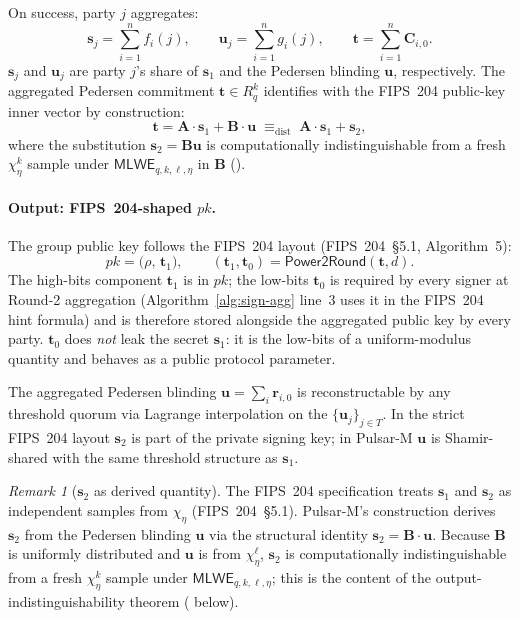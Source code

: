 \documentclass[11pt,a4paper]{article}
\theoremstyle{definition}
\theoremstyle{remark}
\newtheorem{remark}{Remark}
\newcommand{\Rq}{R_q}
\newcommand{\MLWE}{\mathsf{MLWE}}
\newcommand{\Power}{\mathsf{Power2Round}}
\begin{document}
On success, party $j$ aggregates:
\[
\mathbf{s}_j = \sum_{i=1}^n f_i(j), \qquad
\mathbf{u}_j = \sum_{i=1}^n g_i(j), \qquad
\mathbf{t} = \sum_{i=1}^n \mathbf{C}_{i,0}.
\]
$\mathbf{s}_j$ and $\mathbf{u}_j$ are party $j$'s share of $\mathbf{s}_1$
and the Pedersen blinding $\mathbf{u}$, respectively. The aggregated
Pedersen commitment $\mathbf{t} \in \Rq^k$ identifies with the FIPS~204
public-key inner vector by construction:
\[
\mathbf{t} = \mathbf{A} \cdot \mathbf{s}_1 + \mathbf{B} \cdot \mathbf{u}
\;\equiv_{\mathrm{dist}}\;
\mathbf{A} \cdot \mathbf{s}_1 + \mathbf{s}_2,
\]
where the substitution $\mathbf{s}_2 = \mathbf{B}\mathbf{u}$ is
computationally indistinguishable from a fresh
$\chi_\eta^k$ sample under $\MLWE_{q,k,\ell,\eta}$ in $\mathbf{B}$
().

\paragraph{Output: FIPS~204-shaped $\mathit{pk}$.}
The group public key follows the FIPS~204 layout
(FIPS~204~\S5.1, Algorithm~5):
\[
\mathit{pk} = \bigl(\rho,\,\mathbf{t}_1\bigr), \qquad
(\mathbf{t}_1, \mathbf{t}_0) = \Power(\mathbf{t}, d).
\]
The high-bits component $\mathbf{t}_1$ is in $\mathit{pk}$; the low-bits
$\mathbf{t}_0$ is required by every signer at Round-2 aggregation
(Algorithm~\ref{alg:sign-agg} line~3 uses it in the FIPS~204 hint
formula) and is therefore stored alongside the aggregated public key
by every party. $\mathbf{t}_0$ does \emph{not} leak the secret
$\mathbf{s}_1$: it is the low-bits of a uniform-modulus quantity and
behaves as a public protocol parameter.

The aggregated Pedersen blinding $\mathbf{u} = \sum_i \mathbf{r}_{i,0}$
is reconstructable by any threshold quorum via Lagrange interpolation
on the $\{\mathbf{u}_j\}_{j \in T}$. In the strict FIPS~204 layout
$\mathbf{s}_2$ is part of the private signing key; in Pulsar-M
$\mathbf{u}$ is Shamir-shared with the same threshold structure as
$\mathbf{s}_1$.

\begin{remark}[$\mathbf{s}_2$ as derived quantity]
The FIPS~204 specification treats $\mathbf{s}_1$ and $\mathbf{s}_2$
as independent samples from $\chi_\eta$ (FIPS~204~\S5.1). Pulsar-M's
construction derives $\mathbf{s}_2$ from the Pedersen blinding
$\mathbf{u}$ via the structural identity
$\mathbf{s}_2 = \mathbf{B} \cdot \mathbf{u}$. Because $\mathbf{B}$ is
uniformly distributed and $\mathbf{u}$ is from $\chi_\eta^\ell$,
$\mathbf{s}_2$ is computationally indistinguishable from a fresh
$\chi_\eta^k$ sample under $\MLWE_{q, k, \ell, \eta}$; this is the
content of the output-indistinguishability theorem
( below).
\end{remark}
\end{document}
